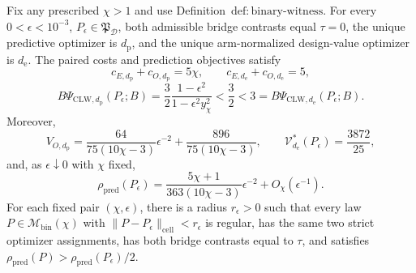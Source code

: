 Fix any prescribed \(\chi>1\) and use Definition~\(\mathrm{def{:}binary\text{-}witness}\). For every \(0<\epsilon<10^{-3}\), \(P_\epsilon\in\mathfrak P_{\mathcal D}\), both admissible bridge contrasts equal \(\tau=0\), the unique predictive optimizer is \(d_{\mathrm p}\), and the unique arm-normalized design-value optimizer is \(d_{\mathrm e}\). The paired costs and prediction objectives satisfy
\[
 c_{E,d_{\mathrm p}}+c_{O,d_{\mathrm p}}=5\chi,
 \qquad
 c_{E,d_{\mathrm e}}+c_{O,d_{\mathrm e}}=5,
\]
\[
 B\Psi_{\mathrm{CLW},d_{\mathrm p}}(P_\epsilon;B)
 =\frac32\frac{1-\epsilon^2}{1-\epsilon^2y_\chi^2}
 <\frac32<3
 =B\Psi_{\mathrm{CLW},d_{\mathrm e}}(P_\epsilon;B).
\]
Moreover,
\[
 V_{O,d_{\mathrm p}}
 =\frac{64}{75(10\chi-3)}\epsilon^{-2}
 +\frac{896}{75(10\chi-3)},
 \qquad
 \mathcal V_{d_{\mathrm e}}^*(P_\epsilon)=\frac{3872}{25},
\]
and, as \(\epsilon\downarrow0\) with \(\chi\) fixed,
\[
 \rho_{\mathrm{pred}}(P_\epsilon)
 =\frac{5\chi+1}{363(10\chi-3)}\epsilon^{-2}
 +O_\chi(\epsilon^{-1}).
\]
For each fixed pair \((\chi,\epsilon)\), there is a radius \(r_\epsilon>0\) such that every law \(P\in\mathcal M_{\mathrm{bin}}(\chi)\) with \(\|P-P_\epsilon\|_{\mathrm{cell}}<r_\epsilon\) is regular, has the same two strict optimizer assignments, has both bridge contrasts equal to \(\tau\), and satisfies \(\rho_{\mathrm{pred}}(P)>\rho_{\mathrm{pred}}(P_\epsilon)/2\).
